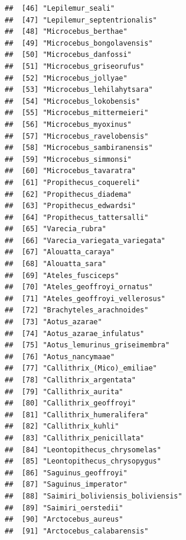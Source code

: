 \documentclass[]{article}
\begin{document}
\begin{verbatim}
##  [46] "Lepilemur_seali"                              
##  [47] "Lepilemur_septentrionalis"                    
##  [48] "Microcebus_berthae"                           
##  [49] "Microcebus_bongolavensis"                     
##  [50] "Microcebus_danfossi"                          
##  [51] "Microcebus_griseorufus"                       
##  [52] "Microcebus_jollyae"                           
##  [53] "Microcebus_lehilahytsara"                     
##  [54] "Microcebus_lokobensis"                        
##  [55] "Microcebus_mittermeieri"                      
##  [56] "Microcebus_myoxinus"                          
##  [57] "Microcebus_ravelobensis"                      
##  [58] "Microcebus_sambiranensis"                     
##  [59] "Microcebus_simmonsi"                          
##  [60] "Microcebus_tavaratra"                         
##  [61] "Propithecus_coquereli"                        
##  [62] "Propithecus_diadema"                          
##  [63] "Propithecus_edwardsi"                         
##  [64] "Propithecus_tattersalli"                      
##  [65] "Varecia_rubra"                                
##  [66] "Varecia_variegata_variegata"                  
##  [67] "Alouatta_caraya"                              
##  [68] "Alouatta_sara"                                
##  [69] "Ateles_fusciceps"                             
##  [70] "Ateles_geoffroyi_ornatus"                     
##  [71] "Ateles_geoffroyi_vellerosus"                  
##  [72] "Brachyteles_arachnoides"                      
##  [73] "Aotus_azarae"                                 
##  [74] "Aotus_azarae_infulatus"                       
##  [75] "Aotus_lemurinus_griseimembra"                 
##  [76] "Aotus_nancymaae"                              
##  [77] "Callithrix_(Mico)_emiliae"                    
##  [78] "Callithrix_argentata"                         
##  [79] "Callithrix_aurita"                            
##  [80] "Callithrix_geoffroyi"                         
##  [81] "Callithrix_humeralifera"                      
##  [82] "Callithrix_kuhli"                             
##  [83] "Callithrix_penicillata"                       
##  [84] "Leontopithecus_chrysomelas"                   
##  [85] "Leontopithecus_chrysopygus"                   
##  [86] "Saguinus_geoffroyi"                           
##  [87] "Saguinus_imperator"                           
##  [88] "Saimiri_boliviensis_boliviensis"              
##  [89] "Saimiri_oerstedii"                            
##  [90] "Arctocebus_aureus"                            
##  [91] "Arctocebus_calabarensis"                      

\end{verbatim}
\end{document}

